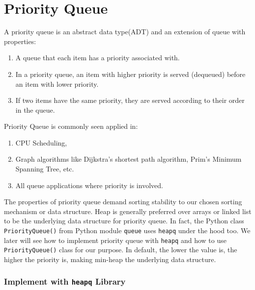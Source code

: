 \documentclass[../main.tex]{subfiles}
\begin{document}
\section{Priority Queue}
\label{sec_priority_queue}
A priority queue is an abstract data type(ADT) and an extension of queue with properties: 
\begin{enumerate}
    \item A queue that each item has a priority associated with.
    \item In a priority queue, an item with higher priority is served (dequeued) before an item with lower priority. 
    \item If two items have the same priority, they are served according to their order in the queue. 
\end{enumerate}
Priority Queue is commonly seen applied in:
\begin{enumerate}
    \item CPU Scheduling, 
    \item Graph algorithms like Dijkstra’s shortest path algorithm, Prim’s Minimum Spanning Tree, etc.
    \item All queue applications where priority is involved. 
\end{enumerate}
The  properties of priority queue demand sorting stability to our chosen sorting mechanism or data structure.  Heap is generally preferred over arrays or linked list to be the underlying data structure for priority queue. In fact, the Python class  \texttt{PriorityQueue()} from Python module \texttt{queue} uses \texttt{heapq} under the hood too. 
We later will see how to implement priority queue with \texttt{heapq} and how to use \texttt{PriorityQueue()} class for our purpose. In default, the lower the value is, the higher the priority is, making min-heap the underlying data structure. 
\subsubsection{Implement with \texttt{heapq}  Library} 
\end{document}
